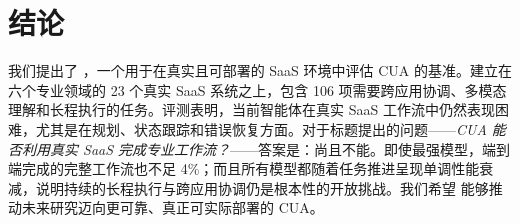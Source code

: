\section{结论}
\label{con}

我们提出了 \datasetname，一个用于在真实且可部署的 SaaS 环境中评估 CUA 的基准。\datasetname 建立在六个专业领域的 23 个真实 SaaS 系统之上，包含 106 项需要跨应用协调、多模态理解和长程执行的任务。评测表明，当前智能体在真实 SaaS 工作流中仍然表现困难，尤其是在规划、状态跟踪和错误恢复方面。对于标题提出的问题——\emph{CUA 能否利用真实 SaaS 完成专业工作流？}——答案是：尚且不能。即使最强模型，端到端完成的完整工作流也不足 4\%；而且所有模型都随着任务推进呈现单调性能衰减，说明持续的长程执行与跨应用协调仍是根本性的开放挑战。我们希望 \datasetname 能够推动未来研究迈向更可靠、真正可实际部署的 CUA。
